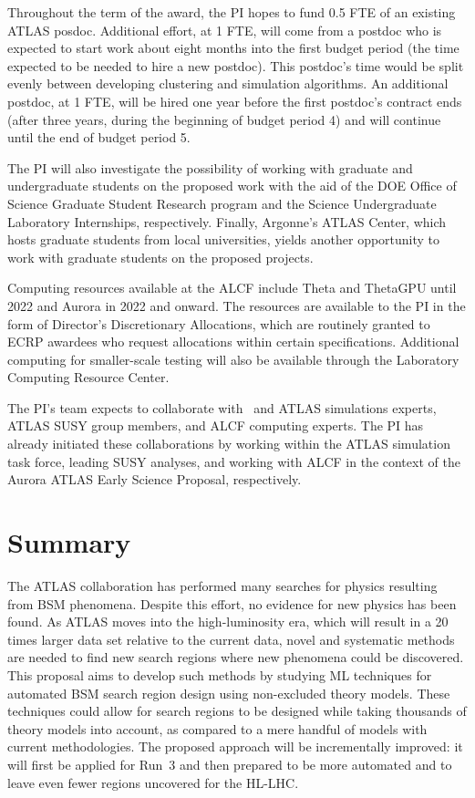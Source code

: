 \documentclass[letter, USenglish, 11pt, subfigure]{article}
\begin{document}
Throughout the term of the award, the PI hopes to fund 0.5 FTE of an existing ATLAS posdoc. Additional effort, at 1 FTE, will come from a postdoc who is expected to start work about eight months into the first budget period (the time expected to be needed to hire a new postdoc). This postdoc's time would be split evenly between developing clustering and simulation algorithms. An additional postdoc, at 1 FTE, will be hired one year before the first postdoc's contract ends (after three years, during the beginning of budget period 4) and will continue until the end of budget period 5.

The PI will also investigate the possibility of working with graduate and undergraduate students on the proposed work with the aid of the DOE Office of Science Graduate Student Research program and the Science Undergraduate Laboratory Internships, respectively. Finally, Argonne's ATLAS Center, which hosts graduate students from local universities, yields another opportunity to work with graduate students on the proposed projects. 

Computing resources available at the ALCF include Theta and ThetaGPU until 2022 and Aurora in 2022 and onward. The resources are available to the PI in the form of Director's Discretionary Allocations, which are routinely granted to ECRP awardees who request allocations within certain specifications. Additional computing for smaller-scale testing will also be available through the Laboratory Computing Resource Center.

The PI's team expects to collaborate with \GEANT\ and ATLAS simulations experts, ATLAS SUSY group members, and ALCF computing experts. The PI has already initiated these collaborations by working within the ATLAS simulation task force, leading SUSY analyses, and working with ALCF in the context of the Aurora ATLAS Early Science Proposal, respectively. 

\section{Summary}

The ATLAS collaboration has performed many searches for physics resulting from BSM phenomena. Despite this effort, no evidence for new physics has been found. As ATLAS moves into the high-luminosity era, which will result in a 20 times larger data set relative to the current data, novel and systematic methods are needed to find new search regions where new phenomena could be discovered. This proposal aims to develop such methods by studying ML techniques for automated BSM search region design using non-excluded theory models. These techniques could allow for search regions to be designed while taking thousands of theory models into account, as compared to a mere handful of models with current methodologies. The proposed approach will be incrementally improved: it will first be applied for Run~3 and then prepared to be more automated and to leave even fewer regions uncovered for the HL-LHC. 
\end{document}
